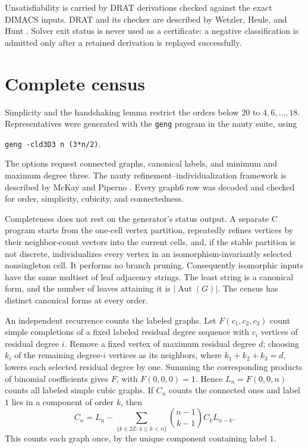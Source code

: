 \documentclass[11pt]{article}
\begin{document}
Unsatisfiability is carried by DRAT derivations checked against the exact
DIMACS inputs.  DRAT and its checker are described by Wetzler, Heule, and
Hunt \cite{WetzlerEtAl2014}.  Solver exit status is never used as a
certificate: a negative classification is admitted only after a retained
derivation is replayed successfully.

\section{Complete census}

Simplicity and the handshaking lemma restrict the orders below \(20\) to
\(4,6,\ldots,18\).  Representatives were generated with the
\texttt{geng} program in the nauty suite, using
\begin{center}
\texttt{geng -cld3D3 n (3*n/2)}.
\end{center}
The options request connected graphs, canonical labels, and minimum and
maximum degree three.  The nauty refinement--individualization framework
is described by McKay and Piperno \cite{McKayPiperno2014}.  Every graph6
row was decoded and checked for order, simplicity, cubicity, and
connectedness.

Completeness does not rest on the generator's status output.  A separate
C program starts from the one-cell vertex partition, repeatedly refines
vertices by their neighbor-count vectors into the current cells, and, if
the stable partition is not discrete, individualizes every vertex in an
isomorphism-invariantly selected nonsingleton cell.  It performs no branch
pruning.  Consequently isomorphic inputs have the same multiset of leaf
adjacency strings.  The least string is a canonical form, and the number
of leaves attaining it is \(|\operatorname{Aut}(G)|\).  The census has
distinct canonical forms at every order.

An independent recurrence counts the labeled graphs.  Let
\(F(c_1,c_2,c_3)\) count simple completions of a fixed labeled residual
degree sequence with \(c_i\) vertices of residual degree \(i\).  Remove a
fixed vertex of maximum residual degree \(d\); choosing \(k_i\) of the
remaining degree-\(i\) vertices as its neighbors, where
\(k_1+k_2+k_3=d\), lowers each selected residual degree by one.  Summing
the corresponding products of binomial coefficients gives \(F\), with
\(F(0,0,0)=1\).  Hence \(L_n=F(0,0,n)\) counts all labeled simple cubic
graphs.  If \(C_n\) counts the connected ones and label \(1\) lies in a
component of order \(k\), then
\[
 C_n=L_n-
 \sum_{\{k\in 2\mathbb{Z}:4\leq k<n\}}
 \binom{n-1}{k-1}C_kL_{n-k}.
\]
This counts each graph once, by the unique component containing label
\(1\).
\end{document}
